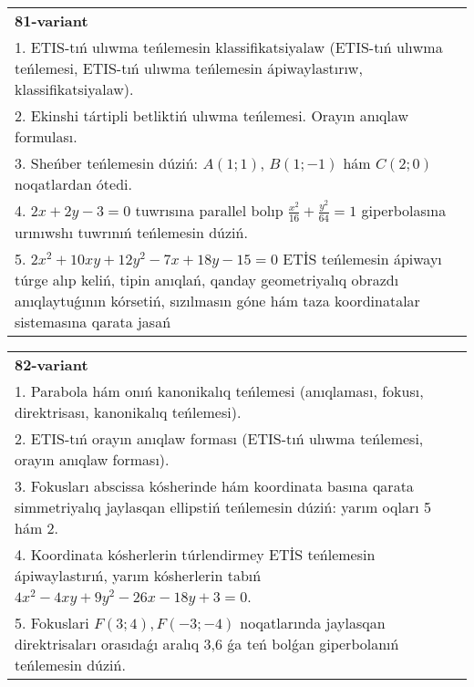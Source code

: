 \documentclass{article}
\begin{document}
\begin{tabular}{m{17cm}}
\textbf{81-variant}\\
1. ETIS-tıń ulıwma teńlemesin klassifikatsiyalaw (ETIS-tıń ulıwma teńlemesi, ETIS-tıń ulıwma teńlemesin ápiwaylastırıw, klassifikatsiyalaw).\\

2. Ekinshi tártipli betliktiń ulıwma teńlemesi. Orayın anıqlaw formulası.\\

3. Sheńber teńlemesin dúziń: $A (1;1) $, $B (1;-1) $ hám $C (2;0) $ noqatlardan ótedi.\\

4. $2x + 2y - 3 = 0$ tuwrısına parallel bolıp $\frac{x^{2}}{16} + \frac{y^{2}}{64} = 1$ giperbolasına urınıwshı tuwrınıń teńlemesin dúziń.  \\

5. $2x^{2} + 10xy + 12y^{2} - 7x + 18y - 15 = 0$ ETİS teńlemesin ápiwayı túrge alıp keliń, tipin anıqlań, qanday geometriyalıq obrazdı anıqlaytuǵının kórsetiń, sızılmasın góne hám taza koordinatalar sistemasına qarata jasań  
\end{tabular}
\vspace{1cm}


\begin{tabular}{m{17cm}}
\textbf{82-variant}\\
1. Parabola hám onıń kanonikalıq teńlemesi (anıqlaması, fokusı, direktrisası, kanonikalıq teńlemesi).\\

2. ETIS-tıń orayın anıqlaw forması (ETIS-tıń ulıwma teńlemesi, orayın anıqlaw forması).\\

3. Fokusları abscissa kósherinde hám koordinata basına qarata simmetriyalıq jaylasqan ellipstiń teńlemesin dúziń: yarım oqları 5 hám 2.\\

4. Koordinata kósherlerin túrlendirmey ETİS teńlemesin ápiwaylastırıń, yarım kósherlerin tabıń $4x^{2} - 4xy + 9y^{2} - 26x - 18y + 3 = 0$.\\

5. Fokuslari $F(3;4), F(-3;-4)$ noqatlarında jaylasqan direktrisaları orasıdaǵı aralıq 3,6 ǵa teń bolǵan giperbolanıń teńlemesin dúziń.  
\end{tabular}
\vspace{1cm}
\end{document}
